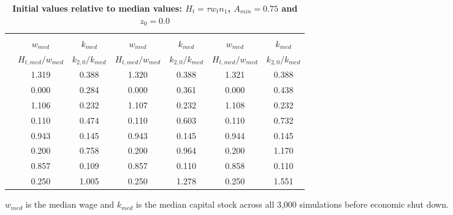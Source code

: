 \documentclass[letterpaper,12pt]{article}
\theoremstyle{definition}
\begin{document}
\begin{spacing}{1.5}
  \begin{table}[htbp]\centering\captionsetup{width=6.0in}
  \caption{\label{TabInitVal_tA75}\textbf{Initial values relative to median values: $H_t = \tau w_t n_1$, $A_{min}=0.75$ and $z_0=0.0$}}
    \begin{threeparttable}
    \begin{tabular}{>{\small}c| >{\small}c >{\small}c| >{\small}c >{\small}c| >{\small}c >{\small}c}
      \hline\hline
      & \multicolumn{2}{c}{$k_{2,0}=0.11$} & \multicolumn{2}{c}{$k_{2,0}=0.14$} & \multicolumn{2}{c}{$k_{2,0}=0.17$} \\ \cline{2-7}
      & $w_{med}$ & $k_{med}$ & $w_{med}$ & $k_{med}$ & $w_{med}$ & $k_{med}$ \\
      & $H_{t,med}/w_{med}$ & $k_{2,0}/k_{med}$ & $H_{t,med}/w_{med}$ & $k_{2,0}/k_{med}$ & $H_{t,med}/w_{med}$ & $k_{2,0}/k_{med}$ \\
      \hline
      \multirow{2}{*}{$\tau=0.00$}
      & 1.319 & 0.388 & 1.320 & 0.388 & 1.321 & 0.388 \\
      & 0.000 & 0.284 & 0.000 & 0.361 & 0.000 & 0.438 \\
      \hline
      \multirow{2}{*}{$\tau=0.11$}
      & 1.106 & 0.232 & 1.107 & 0.232 & 1.108 & 0.232 \\
      & 0.110 & 0.474 & 0.110 & 0.603 & 0.110 & 0.732 \\
      \hline
      \multirow{2}{*}{$\tau=0.20$}
      & 0.943 & 0.145 & 0.943 & 0.145 & 0.944 & 0.145 \\
      & 0.200 & 0.758 & 0.200 & 0.964 & 0.200 & 1.170 \\
      \hline
      \multirow{2}{*}{$\tau=0.25$}
      & 0.857 & 0.109 & 0.857 & 0.110 & 0.858 & 0.110 \\
      & 0.250 & 1.005 & 0.250 & 1.278 & 0.250 & 1.551 \\
      \hline\hline
    \end{tabular}
    \begin{tablenotes}
      \scriptsize{\item[]$w_{med}$ is the median wage and $k_{med}$ is the median capital stock across all 3,000 simulations before economic shut down.}
    \end{tablenotes}
    \end{threeparttable}
  \end{table}

  \clearpage


\end{spacing}
\end{document}
